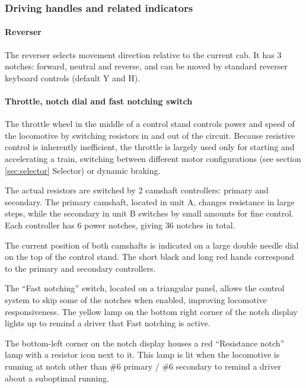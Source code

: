 \documentclass[11pt, a4paper]{article}
\begin{document}
\subsubsection{Driving handles and related indicators}

\paragraph{Reverser}
The reverser selects movement direction relative to the current cab. It has 3 notches: forward, neutral and reverse, and can be moved by standard reverser keyboard controls (default Y and H).

\paragraph{Throttle, notch dial and fast notching switch}
The throttle wheel in the middle of a control stand controls power and speed of the locomotive by switching resistors in and out of the circuit. Because resistive control is inherently inefficient, the throttle is largely used only for starting and accelerating a train, switching between different motor configurations (see section \ref{sec:selector} Selector) or dynamic braking.

The actual resistors are switched by 2 camshaft controllers: primary and secondary. The primary camshaft, located in unit A, changes resistance in large steps, while the secondary in unit B switches by small amounts for fine control. Each controller has 6 power notches\footnotemark, giving 36 notches in total. 

The current position of both camshafts is indicated on a large double needle dial on the top of the control stand. The short black and long red hands correspond to the primary and secondary controllers.

The ``Fast notching'' switch, located on a triangular panel, allows the control system to skip some of the notches when enabled, improving locomotive responsiveness. The yellow lamp on the bottom right corner of the notch display lights up to remind a driver that Fast notching is active.

The bottom-left corner on the notch display houses a red ``Resistance notch'' lamp with a resistor icon next to it. This lamp is lit when the locomotive is running at notch other than \#6 primary / \#6 secondary to remind a driver about a suboptimal running.
\end{document}
